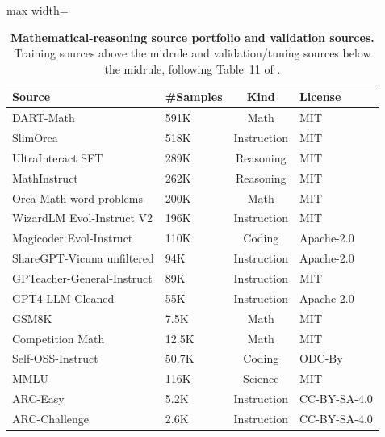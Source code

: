 \documentclass{article}
\theoremstyle{normaltheorem}
\begin{document}
\begin{table}[t]
  \centering
  \caption{\textbf{Mathematical-reasoning source portfolio and validation sources.}
  Training sources above the midrule and validation/tuning sources below the midrule, following Table~11 of \citet{pan2025scalebio}.}
  \label{tab:math-source-portfolio}
  \begin{adjustbox}{max width=\textwidth}
  \begin{tabular}{llcl}
    \toprule
    Source & \#Samples & Kind & License \\
    \midrule
    DART-Math & 591K & Math & MIT \\
    SlimOrca & 518K & Instruction & MIT \\
    UltraInteract SFT & 289K & Reasoning & MIT \\
    MathInstruct & 262K & Reasoning & MIT \\
    Orca-Math word problems & 200K & Math & MIT \\
    WizardLM Evol-Instruct V2 & 196K & Instruction & MIT \\
    Magicoder Evol-Instruct & 110K & Coding & Apache-2.0 \\
    ShareGPT-Vicuna unfiltered & 94K & Instruction & Apache-2.0 \\
    GPTeacher-General-Instruct & 89K & Instruction & MIT \\
    GPT4-LLM-Cleaned & 55K & Instruction & Apache-2.0 \\
    \midrule
    GSM8K & 7.5K & Math & MIT \\
    Competition Math & 12.5K & Math & MIT \\
    Self-OSS-Instruct & 50.7K & Coding & ODC-By \\
    MMLU & 116K & Science & MIT \\
    ARC-Easy & 5.2K & Instruction & CC-BY-SA-4.0 \\
    ARC-Challenge & 2.6K & Instruction & CC-BY-SA-4.0 \\
    \bottomrule
  \end{tabular}
  \end{adjustbox}
\end{table}
\end{document}
